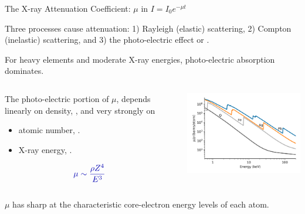 \begin{slide}{The X-ray Attenuation Coefficient: $\mu$ in $I = I_0 e^{-\mu t}  $}

  \begin{cenpage}{125mm}
    Three processes cause attenuation: 1) Rayleigh (elastic) scattering, 2)
    Compton (inelastic) scattering, and 3) the photo-electric effect or
    {}.
    
  \vmm

  For heavy elements and moderate X-ray
  energies, photo-electric absorption dominates.
  \vmm
  
  \end{cenpage}
      

  \begin{columns}[T]
    \begin{column}{45mm}

      \vmm

      The photo-electric portion of $\mu$, depends linearly on
      density, {\Blue{$\rho$}}, and very strongly on
      
      \begin{itemize}
      \item   atomic number,  {}.
      \item   X-ray energy,  {}.
      \end{itemize}
          
      \vmm

      \begin{postitbox}{30mm}      
      {\Large{
      \[ {\Blue{ \mu \sim \frac{\rho Z^4}{ E^3} }} \]
    }}
  \end{postitbox}
  
    \end{column}
    \begin{column}{105mm}
      
      \includegraphics[width=90mm]{figs/general/murho_total}


    \end{column}
  \end{columns}

\begin{cenpage}{130mm}
  $\mu$ has sharp {} at the characteristic
  core-electron energy levels of each atom.
\end{cenpage}

\vmm
\vfill

\end{slide}



